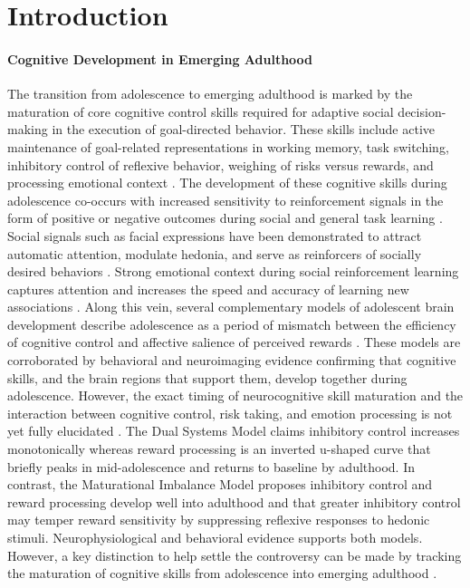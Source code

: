 \documentclass[utf8]{stylesheet}
\begin{document}
\section{Introduction}
\paragraph{Cognitive Development in Emerging Adulthood}
The transition from adolescence to emerging adulthood is marked by the maturation of core cognitive control skills required for adaptive social decision-making in the execution of goal-directed behavior. These skills include active maintenance of goal-related representations in working memory, task switching, inhibitory control of reflexive behavior, weighing of risks versus rewards, and processing emotional context \citep{luna2015}. 
The development of these cognitive skills during adolescence co-occurs with increased sensitivity to reinforcement signals in the form of positive or negative outcomes during social and general task learning \citep{jones2014adolescent, rosenbaum2020valence}. Social signals such as facial expressions have been demonstrated to attract automatic attention, modulate hedonia, and serve as reinforcers of socially desired behaviors \citep{teufel2009social,speer2007face}. Strong emotional context during social reinforcement learning captures attention and increases the speed and accuracy of learning new associations \citep{vernetti2017gaze,roper2014value}. Along this vein, several complementary models of adolescent brain development describe adolescence as a period of mismatch between the efficiency of cognitive control and affective salience of perceived rewards \citep{CaseyEtAl2008, LunaWright2016}. These models are corroborated by behavioral and neuroimaging evidence confirming that cognitive skills, and the brain regions that support them, develop together during adolescence.  However, the exact timing of neurocognitive skill maturation and the interaction between cognitive control, risk taking, and emotion processing is not yet fully elucidated \citep{shulman2016dual, duell2016interaction}. The Dual Systems Model claims inhibitory control increases monotonically whereas reward processing is an inverted u-shaped curve that briefly peaks in mid-adolescence and returns to baseline by adulthood. In contrast, the Maturational Imbalance Model proposes inhibitory control and reward processing develop well into adulthood and that greater inhibitory control may temper reward sensitivity by suppressing reflexive responses to hedonic stimuli. Neurophysiological and behavioral evidence supports both models. However, a key distinction to help settle the controversy can be made by tracking the maturation of cognitive skills from adolescence into emerging adulthood \citep{Steinberg2010,somerville2016searching}.
%
\end{document}

